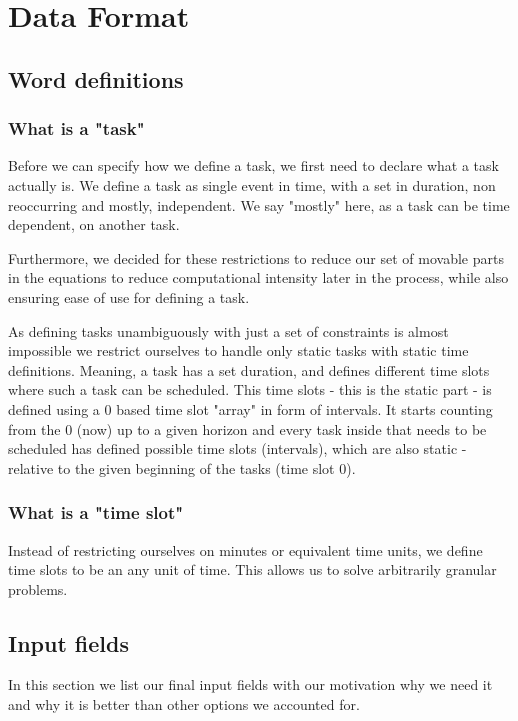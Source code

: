\cleardoubleoddpage%
\chapter{Data Format}
\label{sec:data-format}
\section{Word definitions}
\subsection*{What is a "task"}
Before we can specify how we define a task, we first need to declare what a task actually is. We define a task as single event in time, with a set in duration, non reoccurring and mostly, independent. We say "mostly" here, as a task can be time dependent, on another task.

Furthermore, we decided for these restrictions to reduce our set of movable parts in the equations to reduce computational intensity later in the process, while also ensuring ease of use for defining a task.

As defining tasks unambiguously with just a set of constraints is almost impossible we restrict ourselves to handle only static tasks with static time definitions. Meaning, a task has a set duration, and defines different time slots where such a task can be scheduled. This time slots - this is the static part - is defined using a 0 based time slot "array" in form of intervals. It starts counting from the 0 (now) up to a given horizon and every task inside that needs to be scheduled has defined possible time slots (intervals), which are also static - relative to the given beginning of the tasks (time slot 0).

\subsection*{What is a "time slot"}
Instead of restricting ourselves on minutes or equivalent time units, we define time slots to be an any unit of time. This allows us to solve arbitrarily granular problems.

\section{Input fields}
In this section we list our final input fields with our motivation why we need it and why it is better than other options we accounted for.
